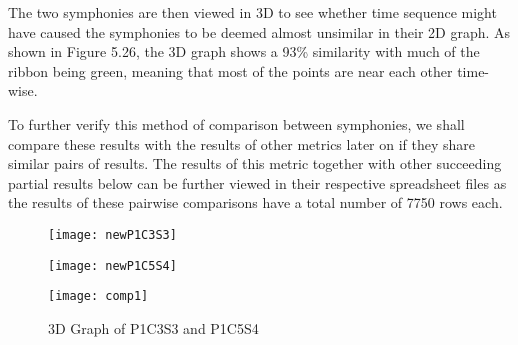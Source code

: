 The two symphonies are then viewed in 3D to see whether time sequence might have caused the symphonies to be deemed almost unsimilar in their 2D graph. As shown in Figure 5.26, the 3D graph shows a 93\% similarity with much of the ribbon being green, meaning that most of the points are near each other time-wise.

To further verify this method of comparison between symphonies, we shall compare these results with the results of other metrics later on if they share similar pairs of results. The results of this metric together with other succeeding partial results below can be further viewed in their respective spreadsheet files as the results of these pairwise comparisons have a total number of 7750 rows each.

\begin{figure}[H]
\begin{minipage}{.5\textwidth}
  \centering
  \texttt{[image: newP1C3S3]}
  \label{fig:test1}
\end{minipage}
\begin{minipage}{.5\textwidth}
  \centering
  \texttt{[image: newP1C5S4]}
  \label{fig:test2}
\end{minipage}
\end{figure}

\begin{figure}[H]
\caption{3D Graph of P1C3S3 and P1C5S4}
\centering
\texttt{[image: comp1]}
\end{figure}

